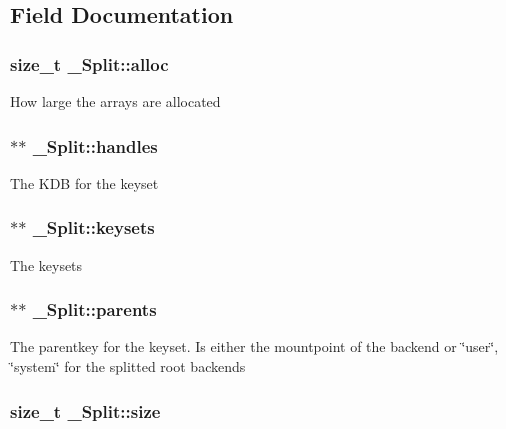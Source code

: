 \subsection{Field Documentation}
\hypertarget{struct__Split_af084c1dd24de7ac71077e4c3f444599b}{
\subsubsection[{alloc}]{\setlength{\rightskip}{0pt plus 5cm}size\_\-t {\bf \_\-Split::alloc}}}
\label{struct__Split_af084c1dd24de7ac71077e4c3f444599b}
How large the arrays are allocated \hypertarget{struct__Split_accd11de3cd32ffa2bbaf46d3790fc677}{
\subsubsection[{handles}]{$\ast$$\ast$ {\bf \_\-Split::handles}}}
\label{struct__Split_accd11de3cd32ffa2bbaf46d3790fc677}
The KDB for the keyset \hypertarget{struct__Split_a1e13e127dcd9d7ad26539dc092b6ca42}{
\subsubsection[{keysets}]{$\ast$$\ast$ {\bf \_\-Split::keysets}}}
\label{struct__Split_a1e13e127dcd9d7ad26539dc092b6ca42}
The keysets \hypertarget{struct__Split_a8a069875729343a5e3b2a65b313462fe}{
\subsubsection[{parents}]{$\ast$$\ast$ {\bf \_\-Split::parents}}}
\label{struct__Split_a8a069875729343a5e3b2a65b313462fe}
The parentkey for the keyset. Is either the mountpoint of the backend or \char`\"{}user\char`\"{}, \char`\"{}system\char`\"{} for the splitted root backends \hypertarget{struct__Split_a9c80f6a2c7069e4aca5a47df97e59547}{
\subsubsection[{size}]{\setlength{\rightskip}{0pt plus 5cm}size\_\-t {\bf \_\-Split::size}}}
